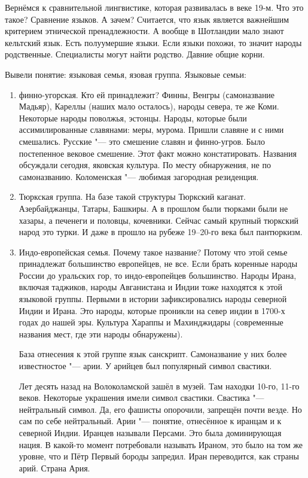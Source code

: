 Вернёмся к сравнительной лингвистике, которая развивалась в веке 19-м. Что это такое? Сравнение языков. А зачем? Считается, что язык является важнейшим критерием этнической пренадлежности. А вообще в Шотландии мало знают кельтский язык. Есть полуумершие языки. Если языки похожи, то значит народы родственные. Специалисты могут найти родство. Давние общие корни.

Вывели понятие: языковая семья, язовая группа. Языковые семьи:
\begin{enumerate}
\item финно-угорская. Кто ей принадлежит? Финны, Венгры (самоназвание Мадьяр), Кареллы (наших мало осталось), народы севера, те же Коми. Некоторые народы поволжья, эстонцы. Народы, которые были ассимилированные славянами: меры, мурома. Пришли славяне и с ними смешались. Русские "--- это смешение славян и финно-угров. Было постепенное вековое смешение. Этот факт можно констатировать. Названия обсуждали сегодня, яковская культура. По месту обнаружения, не по самоназванию. Коломенская "---  любимая загородная резиденция.
\item Тюркская группа. На базе такой структуры Тюркский каганат. Азербайджанцы, Татары, Башкиры. А в прошлом были тюрками были не хазары, а печенеги и половцы, кочевники. Сейчас самый крупный тюркский народ это турки. И даже в прошло на рубеже 19--20-го века был пантюркизм.

\item Индо-европейская семья. Почему такое название? Потому что этой семье принадлежат большинство европейцев, не все. Если брать коренные народы России до уральских гор, то индо-европейцев большинство. Народы Ирана, включая таджиков, народы Авганистана и Индии тоже находятся к этой языковой группы. Первыми в истории зафиксировались народы северной Индии и Ирана. Это народы, которые проникли на север индии в 1700-х годах до нашей эры. Культура Хараппы и Махинджидары (современные названия мест, где эти народы обнаружены).

База отнесения к этой группе язык санскрипт. Самоназвание у них более известностое "--- арии. У арийцев был популярный символ свастики.

Лет десять назад на Волоколамской зашёл в музей. Там находки 10-го, 11-го веков. Некоторые украшения имели символ свастики. Свастика "--- нейтральный символ. Да, его фашисты опорочили, запрещён почти везде. Но сам по себе нейтральный. Арии "--- понятие, отнесённое к иранцам и к северной Индии. Иранцев называли Персами. Это была доминирующая нация. В какой-то момент потребовали называть Ираном, это было на том же уровне, что и Пётр Первый бороды запредил. Иран переводится, как страны арий. Страна Ария.


\end{enumerate}
